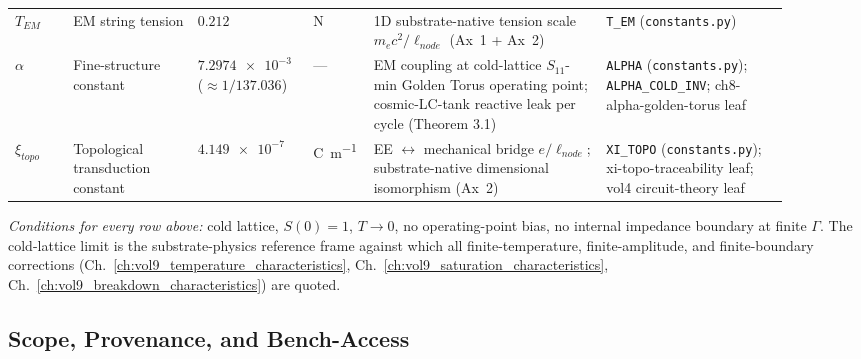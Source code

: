 \begin{footnotesize}
\begin{longtable}{@{}p{0.07\linewidth} p{0.15\linewidth} p{0.13\linewidth} p{0.05\linewidth} p{0.28\linewidth} p{0.22\linewidth}@{}}
$T_{EM}$ & EM string tension & $\num{0.212}$ & \si{\newton} & 1D substrate-native tension scale $m_e c^2 / \ell_{node}$ (Ax~1 + Ax~2) & \texttt{T\_EM} \newline (\texttt{constants.py}) \\
$\alpha$ & Fine-structure constant & $\num{7.2974e-3}$ \newline ($\approx 1/137.036$) & --- & EM coupling at cold-lattice $S_{11}$-min Golden Torus operating point; cosmic-LC-tank reactive leak per cycle (Theorem 3.1) & \texttt{ALPHA} \newline (\texttt{constants.py}); \texttt{ALPHA\_COLD\_INV}; ch8-alpha-golden-torus leaf \\
$\xi_{topo}$ & Topological transduction constant & $\num{4.149e-7}$ & \si{\coulomb\per\metre} & EE $\leftrightarrow$ mechanical bridge $e/\ell_{node}$; substrate-native dimensional isomorphism (Ax~2) & \texttt{XI\_TOPO} \newline (\texttt{constants.py}); xi-topo-traceability leaf; vol4 circuit-theory leaf \\
\bottomrule
\end{longtable}
\end{footnotesize}

\noindent
\textit{Conditions for every row above:} cold lattice, $S(0) = 1$, $T \to 0$, no operating-point bias, no internal impedance boundary at finite $\Gamma$. The cold-lattice limit is the substrate-physics reference frame against which all finite-temperature, finite-amplitude, and finite-boundary corrections (Ch.~\ref{ch:vol9_temperature_characteristics}, Ch.~\ref{ch:vol9_saturation_characteristics}, Ch.~\ref{ch:vol9_breakdown_characteristics}) are quoted.

\subsection{Scope, Provenance, and Bench-Access}
\label{subsec:vol9_dc_scope_provenance}

